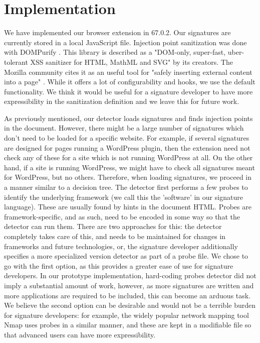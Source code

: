 \section{Implementation}

We have implemented our browser extension in 67.0.2. Our signatures are currently stored in a local JavaScript file. Injection point sanitization was done with DOMPurify \cite{10.1007/978-3-319-66399-9_7}. This library is described as a "DOM-only, super-fast, uber-tolerant XSS sanitizer for HTML, MathML and SVG" by its creators. The Mozilla community cites it as an useful tool for "safely inserting external content into a page" \cite{safecontent}. While it offers a lot of configurability and hooks, we use the default functionality. We think it would be useful for a signature developer to have more expressibility in the sanitization definition and we leave this for future work. 

As previously mentioned, our detector loads signatures and finds injection points in the document. However, there might be a large number of signatures which don't need to be loaded for a specific website. For example, if several signatures are designed for pages running a WordPress plugin, then the extension need not check any of these for a site which is not running WordPress at all. On the other hand, if a site is running WordPress, we might have to check all signatures meant for WordPress, but no others. Therefore, when loading signatures, we proceed in a manner similar to a decision tree. The detector first performs a few probes to identify the underlying framework (we call this the 'software' in our signature language). These are usually found by hints in the document HTML. Probes are framework-specific, and as such, need to be encoded in some way so that the detector can run them. There are two approaches for this: the detector completely takes care of this, and needs to be maintained for changes in frameworks and future technologies, or, the signature developer additionally specifies a more specialized version detector as part of a probe file. We chose to go with the first option, as this provides a greater ease of use for signature developers. In our prototype implementation, hard-coding probes detector did not imply a substantial amount of work, however, as more signatures are written and more applications are required to be included, this can become an arduous task. We believe the second option can be desirable and would not be a terrible burden for signature developers: for example, the widely popular network mapping tool Nmap \cite{nMap} uses probes in a similar manner, and these are kept in a modifiable file so that advanced users can have more expressibility.

